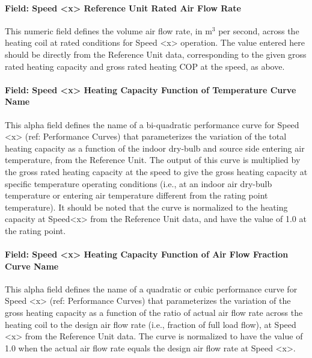 \paragraph{Field: Speed \textless{}x\textgreater{} Reference Unit Rated Air Flow Rate}\label{field-speed-x-reference-unit-rated-air-flow-rate-1}

This numeric field defines the volume air flow rate, in m\(^{3}\) per second, across the heating coil at rated conditions for Speed \textless{}x\textgreater{} operation. The value entered here should be directly from the Reference Unit data, corresponding to the given gross rated heating capacity and gross rated heating COP at the speed, as above.

\paragraph{Field: Speed \textless{}x\textgreater{} Heating Capacity Function of Temperature Curve Name}\label{field-speed-x-heating-capacity-function-of-temperature-curve-name-1}

This alpha field defines the name of a bi-quadratic performance curve for Speed \textless{}x\textgreater{} (ref: Performance Curves) that parameterizes the variation of the total heating capacity as a function of the indoor dry-bulb and source side entering air temperature, from the Reference Unit. The output of this curve is multiplied by the gross rated heating capacity at the speed to give the gross heating capacity at specific temperature operating conditions (i.e., at an indoor air dry-bulb temperature or entering air temperature different from the rating point temperature). It should be noted that the curve is normalized to the heating capacity at Speed\textless{}x\textgreater{} from the Reference Unit data, and have the value of 1.0 at the rating point.

\paragraph{Field: Speed \textless{}x\textgreater{} Heating Capacity Function of Air Flow Fraction Curve Name}\label{field-speed-x-heating-capacity-function-of-air-flow-fraction-curve-name}

This alpha field defines the name of a quadratic or cubic performance curve for Speed \textless{}x\textgreater{} (ref: Performance Curves) that parameterizes the variation of the gross heating capacity as a function of the ratio of actual air flow rate across the heating coil to the design air flow rate (i.e., fraction of full load flow), at Speed \textless{}x\textgreater{} from the Reference Unit data. The curve is normalized to have the value of 1.0 when the actual air flow rate equals the design air flow rate at Speed \textless{}x\textgreater{}.

